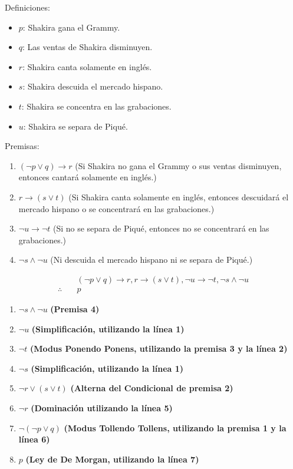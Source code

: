\documentclass{article}
\begin{document}
\begin{enumerate}
 Definiciones:
  \begin{itemize}
    \item $p$: Shakira gana el Grammy.
    \item $q$: Las ventas de Shakira disminuyen.
    \item $r$: Shakira canta solamente en inglés.
    \item $s$: Shakira descuida el mercado hispano.
    \item $t$: Shakira se concentra en las grabaciones.
    \item $u$: Shakira se separa de Piqué.
  \end{itemize}
  
  Premisas:
  \begin{enumerate}
    \item $(\neg p \lor q) \rightarrow r$ (Si Shakira no gana el Grammy o sus ventas disminuyen, entonces cantará solamente en inglés.)
    \item $r \rightarrow (s \lor t)$ (Si Shakira canta solamente en inglés, entonces descuidará el mercado hispano o se concentrará en las grabaciones.)
    \item $\neg u \rightarrow \neg t$ (Si no se separa de Piqué, entonces no se concentrará en las grabaciones.)
    \item $\neg s \land \neg u$ (Ni descuida el mercado hispano ni se separa de Piqué.)
  \end{enumerate}

\[
\begin{array}{rl}
  & (\neg p \lor q) \rightarrow r , r \rightarrow (s \lor t),
   \neg u \rightarrow \neg t,  \neg s \land \neg u
  \\
  \therefore \quad & p
\end{array}
\]
\begin{enumerate}[label=\arabic*.]
  \item \(\neg s \land \neg u\) \quad \textbf{(Premisa 4)}
  \item \(\neg u\) \quad \textbf{(Simplificación, utilizando la línea 1)}
  \item \(\neg t\) \quad \textbf{(Modus Ponendo Ponens, utilizando la premisa 3 y la línea 2)}
  \item \(\neg s\) \quad \textbf{(Simplificación, utilizando la línea 1)}
  \item \(\neg r \lor (s \lor t)\) \quad \textbf{(Alterna del Condicional de premisa 2)}
  \item \(\neg r\) \quad \textbf{(Dominación utilizando la línea 5)}
  \item \(\neg (\neg p \lor q)\) \quad \textbf{(Modus Tollendo Tollens, utilizando la premisa 1 y la línea 6)}
  \item \(p\) \quad \textbf{(Ley de De Morgan, utilizando la línea 7)}
\end{enumerate}


\end{enumerate}
\end{document}
